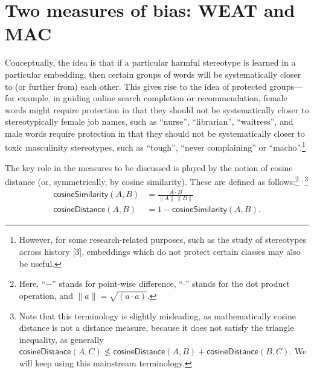 \documentclass[
  12pt,
  dvipsnames,enabledeprecatedfontcommands]{scrartcl}
\begin{document}
\hypertarget{two-measures-of-bias-weat-and-mac}{%
\section{Two measures of bias: WEAT and
MAC}\label{two-measures-of-bias-weat-and-mac}}

\label{sec:two}

Conceptually, the idea is that if a particular harmful stereotype is
learned in a particular embedding, then certain groups of words will be
systematically closer to (or further from) each other. This gives rise
to the idea of protected groups---for example, in guiding online search
completion or recommendation, female words might require protection in
that they should not be systematically closer to stereotypically female
job names, such as ``nurse'', ``librarian'', ``waitress'', and male
words require protection in that they should not be systematically
closer to toxic masculinity stereotypes, such as ``tough'', ``never
complaining'' or ``macho''.\footnote{However, for some research-related
  purposes, such as the study of stereotypes across history {[}3{]},
  embeddings which do not protect certain classes may also be useful.}

The key role in the measures to be discussed is played by the notion of
cosine distance (or, symmetrically, by cosine similarity). These are
defined as follows:\footnote{Here, ``\(-\)'' stands for point-wise
  difference, ``\(\cdot\)'' stands for the dot product operation, and
  \(\lVert a\rVert = \sqrt{(a \cdot a)}\).}
\(^{\!\!\! , \,}\)\footnote{Note that this terminology is slightly
  misleading, as mathematically cosine distance is not a distance
  measure, because it does not satisfy the triangle inequality, as
  generally
  \(\mathsf{cosineDistance}(A,C) \not \leq \mathsf{cosineDistance}(A,B)+ \mathsf{cosineDistance}(B,C)\).
  We will keep using this mainstream terminology.}
\begin{align} \tag{Sim}
\mathsf{cosineSimilarity}(A,B) & = \frac{A \cdot B}{\lVert  A \rVert \,\lVert B \rVert}
\\
\tag{Distance}
\mathsf{cosineDistance}(A,B) &  = 1 - \mathsf{cosineSimilarity}(A,B).
\end{align}
\end{document}
